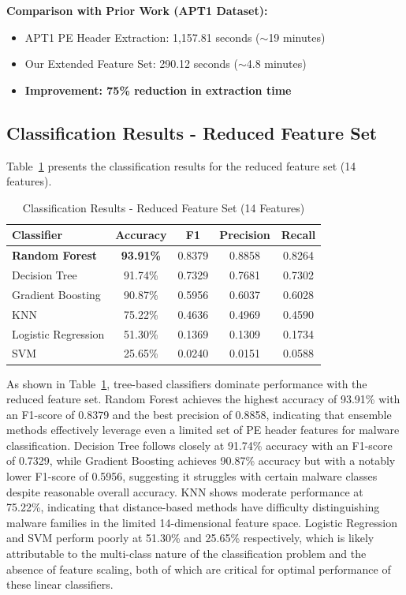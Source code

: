 \documentclass[conference,a4paper]{IEEEtran}
\begin{document}
\textbf{Comparison with Prior Work (APT1 Dataset):}
\begin{itemize}
    \item APT1 PE Header Extraction: 1,157.81 seconds ($\sim$19 minutes)
    \item Our Extended Feature Set: 290.12 seconds ($\sim$4.8 minutes)
    \item \textbf{Improvement: 75\% reduction in extraction time}
\end{itemize}

\subsection{Classification Results - Reduced Feature Set}

Table~\ref{tab:reduced} presents the classification results for the reduced feature set (14 features).

\begin{table}[!htbp]
\centering
\caption{Classification Results - Reduced Feature Set (14 Features)}
\label{tab:reduced}
\begin{tabular}{lcccc}
\toprule
\textbf{Classifier} & \textbf{Accuracy} & \textbf{F1} & \textbf{Precision} & \textbf{Recall} \\
\midrule
\textbf{Random Forest} & \textbf{93.91\%} & 0.8379 & 0.8858 & 0.8264 \\
Decision Tree & 91.74\% & 0.7329 & 0.7681 & 0.7302 \\
Gradient Boosting & 90.87\% & 0.5956 & 0.6037 & 0.6028 \\
KNN & 75.22\% & 0.4636 & 0.4969 & 0.4590 \\
Logistic Regression & 51.30\% & 0.1369 & 0.1309 & 0.1734 \\
SVM & 25.65\% & 0.0240 & 0.0151 & 0.0588 \\
\bottomrule
\end{tabular}
\end{table}

As shown in Table~\ref{tab:reduced}, tree-based classifiers dominate performance with the reduced feature set. Random Forest achieves the highest accuracy of 93.91\% with an F1-score of 0.8379 and the best precision of 0.8858, indicating that ensemble methods effectively leverage even a limited set of PE header features for malware classification. Decision Tree follows closely at 91.74\% accuracy with an F1-score of 0.7329, while Gradient Boosting achieves 90.87\% accuracy but with a notably lower F1-score of 0.5956, suggesting it struggles with certain malware classes despite reasonable overall accuracy. KNN shows moderate performance at 75.22\%, indicating that distance-based methods have difficulty distinguishing malware families in the limited 14-dimensional feature space. Logistic Regression and SVM perform poorly at 51.30\% and 25.65\% respectively, which is likely attributable to the multi-class nature of the classification problem and the absence of feature scaling, both of which are critical for optimal performance of these linear classifiers.
\end{document}
